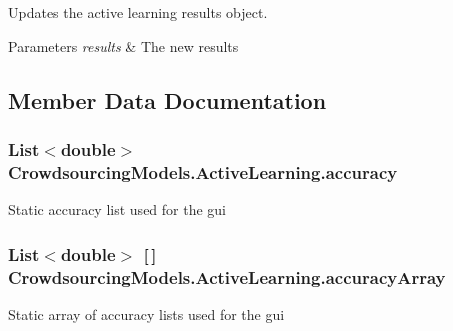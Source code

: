Updates the active learning results object. 


\begin{DoxyParams}{Parameters}
{\em results} & The new results\\
\hline
\end{DoxyParams}


\subsection{Member Data Documentation}
\hypertarget{class_crowdsourcing_models_1_1_active_learning_a1ccb8af29304a1b08074ff2bb44b9af6}{}
\subsubsection[{accuracy}]{\setlength{\rightskip}{0pt plus 5cm}List$<$double$>$ Crowdsourcing\+Models.\+Active\+Learning.\+accuracy\hspace{0.3cm}{\ttfamily [static]}}\label{class_crowdsourcing_models_1_1_active_learning_a1ccb8af29304a1b08074ff2bb44b9af6}


Static accuracy list used for the gui 

\hypertarget{class_crowdsourcing_models_1_1_active_learning_ac95df8d52222fa09da460a1013d303b9}{}
\subsubsection[{accuracy\+Array}]{\setlength{\rightskip}{0pt plus 5cm}List$<$double$>$ \mbox{[}$\,$\mbox{]} Crowdsourcing\+Models.\+Active\+Learning.\+accuracy\+Array\hspace{0.3cm}{\ttfamily [static]}}\label{class_crowdsourcing_models_1_1_active_learning_ac95df8d52222fa09da460a1013d303b9}


Static array of accuracy lists used for the gui 

\hypertarget{class_crowdsourcing_models_1_1_active_learning_ac658e48a670fa0f0b7896cf8e2648556}{}
